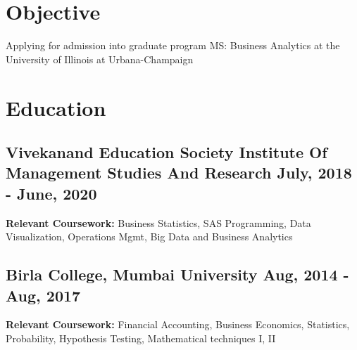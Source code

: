 \documentclass[]{resume}
\begin{document}

\descript{}
\section{Objective}
\hrulefill

Applying for admission into graduate program MS: Business Analytics at the University of Illinois at Urbana-Champaign\hfill

\sectionsep


\section{Education}
\hrulefill

\subsection{Vivekanand Education Society Institute Of Management Studies And Research  \hfill \normalfont July, 2018 - June, 2020}

\begin{adjustwidth}{0.5cm}{0cm}
    \pt \small \textbf{Relevant Coursework:} Business Statistics, SAS Programming, Data Visualization, Operations Mgmt, Big Data and Business Analytics
    
    \sectionsep
\end{adjustwidth}

\subsection{Birla College, Mumbai University \hfill \normalfont Aug, 2014 - Aug, 2017}
\begin{adjustwidth}{0.5cm}{0cm}
    \pt \small \textbf{Relevant Coursework:} Financial Accounting, Business Economics, Statistics, Probability, Hypothesis Testing, Mathematical techniques I, II \\
\sectionsep
\end{adjustwidth}
\end{document}
